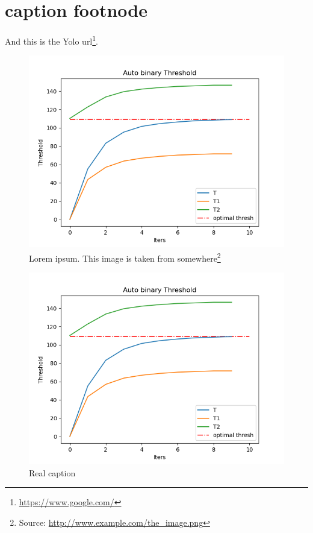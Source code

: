 \documentclass{article}
\begin{document}
\newpage

\section{caption footnode}
And this is the Yolo url\footnote{\label{bbb}\url{https://www.google.com/}}.

\begin{figure}[htb!]
  \begin{center}
    \includegraphics[scale=0.6]{autoThres.png}
      \caption[The LOF caption]{Lorem ipsum. {This image is taken from somewhere\footnote{Source: \url{http://www.example.com/the_image.png}}}}
    \label{fig:cited_img}
    \end{center}
\end{figure}

\begin{figure}
   \centering
    \includegraphics[scale=0.6]{autoThres.png}
   \caption[Caption for LOF]{Real caption\protect\footnotemark}
\end{figure}
\end{document}
